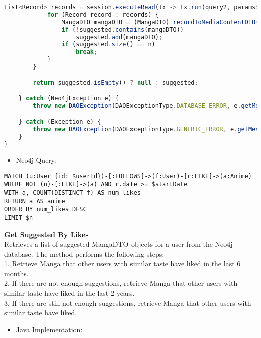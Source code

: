 \begin{lstlisting}[language=JavaScript]
            List<Record> records = session.executeRead(tx -> tx.run(query2, params3).list());
            for (Record record : records) {
                MangaDTO mangaDTO = (MangaDTO) recordToMediaContentDTO(record);
                if (!suggested.contains(mangaDTO))
                    suggested.add(mangaDTO);
                if (suggested.size() == n)
                    break;
            }
        }

        return suggested.isEmpty() ? null : suggested;

    } catch (Neo4jException e) {
        throw new DAOException(DAOExceptionType.DATABASE_ERROR, e.getMessage());

    } catch (Exception e) {
        throw new DAOException(DAOExceptionType.GENERIC_ERROR, e.getMessage());
    }
}
\end{lstlisting}
\begin{itemize}
    \item Neo4j Query:
\end{itemize}
\begin{lstlisting}[language=Cypher]
MATCH (u:User {id: $userId})-[:FOLLOWS]->(f:User)-[r:LIKE]->(a:Anime)
WHERE NOT (u)-[:LIKE]->(a) AND r.date >= $startDate
WITH a, COUNT(DISTINCT f) AS num_likes
RETURN a AS anime
ORDER BY num_likes DESC
LIMIT $n
\end{lstlisting}
\textbf{Get Suggested By Likes}\\
Retrieves a list of suggested MangaDTO objects for a user from the Neo4j database.
The method performs the following steps:\\
1. Retrieve Manga that other users with similar taste have liked in the last 6 months.\\
2. If there are not enough suggestions, retrieve Manga that other users with similar taste have liked in the last 2 years.\\
3. If there are still not enough suggestions, retrieve Manga that other users with similar taste have liked.\\
\begin{itemize}
    \item Java Implementation:
\end{itemize}

